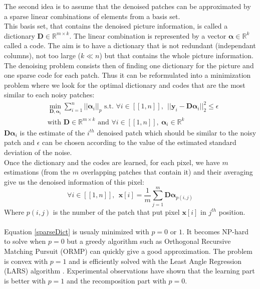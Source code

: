 \documentclass{ipol}
\newcommand{\psize}{m}
\newcommand{\dsize}{k}
\newcommand{\dict}{\textbf{D}}
\newcommand{\code}{\bm{\alpha}}
\newcommand{\pnorm}{p}
\newcommand{\denoi}{\textbf{x}}
\newcommand{\noi}{\textbf{y}}
\newcommand{\RR}{\mathbb{R}}
\begin{document}
The second idea is to assume that the denoised patches can be approximated by a sparse linear combinations of elements from a basis set.\\
This basis set, that contains the denoised picture information, is called a dictionary $\dict \in \RR^{\psize \times \dsize}$. The linear combination is represented by a vector $\code \in \RR^{\dsize}$ called a code.
The aim is to have a dictionary that is not redundant (independant columns), not too large ($\dsize \ll n$) but that contains the whole picture information.\\
The denoising problem consists then of finding one dictionary for the picture and one sparse code for each patch. Thus it can be reformulated into a minimization problem where we look for the optimal dictionary and codes that are the most similar to each noisy patches:
\begin{equation}
\begin{split}
	& \min_{\dict, \code_i} \sum_{i=1}^{n} ||\code_i||_\pnorm \text{ s.t. } \forall i \in [\![1,n]\!],\ \ ||\noi_i  - \dict \code_i||^2_2 \leqslant \epsilon \\
	& \text{with } \dict \in \RR^{\psize \times \dsize} \text{ and } \forall i \in [\![1,n]\!], \ \code_i \in \RR^\dsize
	\label{sparseDict}
\end{split}
\end{equation}
$\dict \code_i$ is the estimate of the $i^{th}$ denoised patch which should be similar to the noisy patch and $\epsilon$ can be chosen according to the value of the estimated standard deviation of the noise.\\
Once the dictionary and the codes are learned, for each pixel, we have $\psize$ estimations (from the $\psize$ overlapping patches that contain it) and their averaging give us the denoised information of this pixel:
\begin{equation}
	\forall i \in [\![1,n]\!], \ \ \denoi[i] = \frac{1}{\psize} \sum_{j=1}^\psize \dict \code_{p(i,j)}
\end{equation}
Where $p(i,j)$ is the number of the patch that put pixel $\denoi[i]$ in $j^{th}$ position.\\
\\
Equation \eqref{sparseDict} is usualy minimized with $\pnorm = 0$ or $1$. It becomes NP-hard to solve when $\pnorm=0$ but a greedy algorithm such as Orthogonal Recursive Matching Pursuit (ORMP) \cite{OMP} can quickly give a good approximation. The problem is convex with $\pnorm=1$ and is efficiently solved with the Least Angle Regression (LARS) algorithm \cite{LARS}. Experimental observations \cite{l0l1} have shown that the learning part is better with $\pnorm=1$ and the recomposition part with $\pnorm=0$.\\
\end{document}
